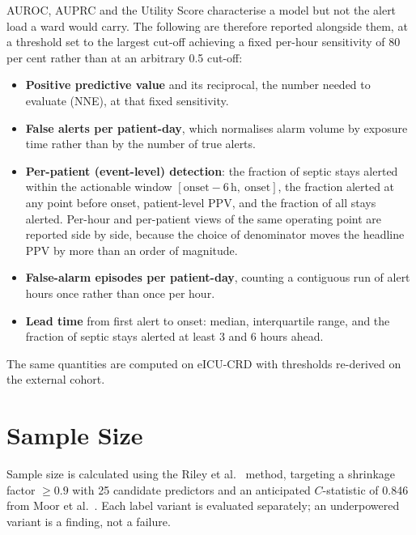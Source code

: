 AUROC, AUPRC and the Utility Score characterise a model but not the alert load
a ward would carry. The following are therefore reported alongside them, at a
threshold set to the largest cut-off achieving a fixed per-hour sensitivity of
80 per cent rather than at an arbitrary 0.5 cut-off:

\begin{itemize}
    \item \textbf{Positive predictive value} and its reciprocal, the number
    needed to evaluate (NNE), at that fixed sensitivity.
    \item \textbf{False alerts per patient-day}, which normalises alarm volume
    by exposure time rather than by the number of true alerts.
    \item \textbf{Per-patient (event-level) detection}: the fraction of septic
    stays alerted within the actionable window
    $[\text{onset}-6\,\text{h},\ \text{onset}]$, the fraction alerted at any
    point before onset, patient-level PPV, and the fraction of all stays
    alerted. Per-hour and per-patient views of the same operating point are
    reported side by side, because the choice of denominator moves the headline
    PPV by more than an order of magnitude.
    \item \textbf{False-alarm episodes per patient-day}, counting a contiguous
    run of alert hours once rather than once per hour.
    \item \textbf{Lead time} from first alert to onset: median, interquartile
    range, and the fraction of septic stays alerted at least 3 and 6 hours
    ahead.
\end{itemize}

The same quantities are computed on eICU-CRD with thresholds re-derived on the
external cohort.


\section{Sample Size}
\label{sec:sample_size}

Sample size is calculated using the Riley et al.\ \cite{riley2019sample}
method, targeting a shrinkage factor $\geq 0.9$ with 25 candidate predictors
and an anticipated $C$-statistic of 0.846 from Moor et al.\
\cite{moor2023review}. Each label variant is evaluated separately; an
underpowered variant is a finding, not a failure.

